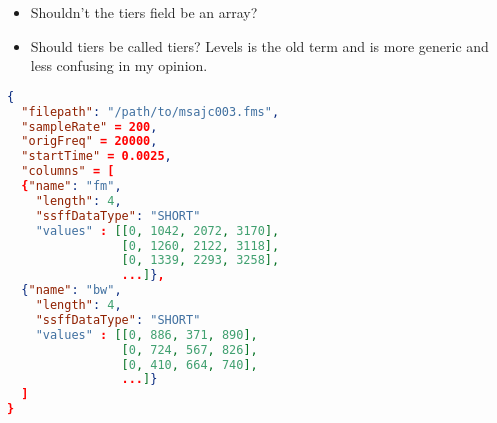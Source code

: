 \documentclass[A4,12pt, utf8]{article}
\begin{document}
\begin{itemize}
  \item Shouldn't the tiers field be an array?
  \item Should tiers be called tiers? Levels is the old term and is more generic and less confusing in my opinion.
\end{itemize}

\begin{lstlisting}[caption=EMU-webApp internal derived signal representation, label=idsr, language=json,firstnumber=1]
{
  "filepath": "/path/to/msajc003.fms",
  "sampleRate" = 200,
  "origFreq" = 20000,
  "startTime" = 0.0025,
  "columns" = [
  {"name": "fm",
    "length": 4,
    "ssffDataType": "SHORT"
    "values" : [[0, 1042, 2072, 3170],
                [0, 1260, 2122, 3118],
                [0, 1339, 2293, 3258],
                ...]},
  {"name": "bw",
    "length": 4,
    "ssffDataType": "SHORT"
    "values" : [[0, 886, 371, 890],
                [0, 724, 567, 826],
                [0, 410, 664, 740],
                ...]}
  ]
}
\end{lstlisting}







\end{document}
